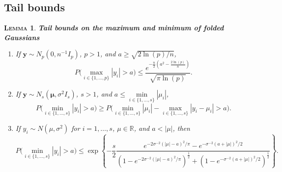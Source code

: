 \documentclass[bj,authoryear]{imsart}
\theoremstyle{plain}
\newtheorem{lem}[thm]{\textsc{Lemma}}
\newcommand{\bs}{\boldsymbol}
\begin{document}
\subsection{Tail bounds}

\begin{lem}\label{lemma:3tailbounds}\textbf{Tail bounds on the maximum and minimum of folded Gaussians} 
\begin{enumerate}[label=(\roman*)]
        \item If $\bs y\sim N_p(0,n^{-1}I_p)$, $p>1$, and $a \geq \sqrt{2\ln(p)/n}$, $$P\Big(\underset{i\in\{1,\ldots,p\}}{\max}|y_i|> a \Big) \leq \frac{e^{-\frac{n}{2}\left(a^2-\frac{2\ln (p)}{n}\right)}}{\sqrt{\pi\ln (p)}}.$$
    \item If $\bs y\sim N_s\left(\bs\mu,\sigma^2I_s\right)$, $s>1$, and $a \leq \underset{i\in\{1,\ldots,s\}}{\min}|\mu_i|$,
        $$P\Big(\underset{i\in\{1,\ldots,s\}}{\min}|y_i| > a\Big) \geq P\Big(\underset{i\in\{1,\ldots,s\}}{\min}|\mu_i|-\underset{i\in\{1,\ldots,s\}}{\max}|y_i-\mu_i| > a \Big).$$
    \item If $y_i\sim N\left(\mu,\sigma^2\right)$ for $i=1,\ldots,s$, $\mu \in \mathbb{R}$, and $a<|\mu|$, then
        $$P\Big(\underset{i\in\{1,\ldots,s\}}{\min}|y_i| > a \Big) \leq \exp\left\{-\frac{s}{2}\frac{e^{-2\sigma^{-2}(|\mu|-a)^2/\pi}-e^{-\sigma^{-2}(a+|\mu|)^2/2}}{\left(1-e^{-2\sigma^{-2}(|\mu|-a)^2/\pi}\right)^{\frac{1}{2}}+\left(1-e^{-\sigma^{-2}(a+|\mu|)^2/2}\right)^{\frac{1}{2}}}\right\}.$$
\end{enumerate}
\end{lem}
\end{document}
